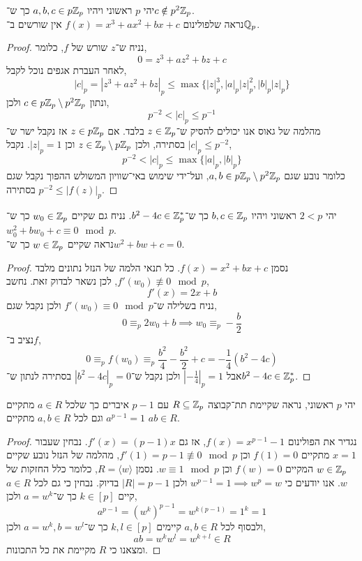 \question{}
יהי $p$ ראשוני ויהיו $a, b, c \in p \mathbb{Z}_p$ כך ש־$c \notin p^2 \mathbb{Z}_p$. \\
נראה שלפולינום $f(x) = x^3 + a x^2 + b x + c$ אין שורשים ב־$\mathbb{Q}_p$.
\begin{proof}
	נניח ש־$z$ שורש של $f$, כלומר,
	\[
		0
		= z^3 + a z^2 + b z + c
	\]
	לאחר העברת אגפים נוכל לקבל,
	\[
		|c|_p
		= |z^3 + a z^2 + b z|_p
		\le \max\{ {|z|}_p^3, |a|_p {|z|}_p^2, |b|_p |z|_p \}
	\]
	ונתון $c \in p \mathbb{Z}_p \setminus p^2 \mathbb{Z}_p$ ולכן,
	\[
		p^{-2}
		< |c|_p
		\le p^{-1}
	\]
	מהלמה של גאוס אנו יכולים להסיק ש־$z \in \mathbb{Z}_p$ בלבד.
	אם $z \in p \mathbb{Z}_p$ אז נקבל ישר ש־$|c|_p \le p^{-2}$ בסתירה, ולכן $z \in \mathbb{Z}_p \setminus p \mathbb{Z}_p$ וכן $|z|_p = 1$.
	נקבל,
	\[
		p^{-2}
		< |c|_p
		\le \max\{ |a|_p, |b|_p \}
	\]
	כלומר נובע שגם $a, b \in p \mathbb{Z}_p \setminus p^2 \mathbb{Z}_p$, ועל־ידי שימוש באי־שוויון המשולש ההפוך נקבל שגם $p^{-2} \le |f(z)|_p$ בסתירה.
\end{proof}

\question{}
יהי $2 < p$ ראשוני ויהיו $b, c \in \mathbb{Z}_p$ כך ש־$b^2 - 4c \in \mathbb{Z}_p^*$.
נניח גם שקיים $w_0 \in \mathbb{Z}_p$ כך ש־$w_0^2 + b w_0 + c \equiv 0 \mod p$. \\
נראה שקיים $w \in \mathbb{Z}_p$ כך ש־$w^2 + b w + c = 0$.
\begin{proof}
	נסמן $f(x) = x^2 + b x + c$.
	כל תנאי הלמה של הנזל נתונים מלבד $f'(w_0) \not\equiv 0 \mod p$, לכן נשאר לבדוק זאת.
	נחשב,
	\[
		f'(x)
		= 2x + b
	\]
	נניח בשלילה ש־$f'(w_0) \equiv 0 \mod p$ ולכן נקבל שגם,
	\[
		0
		\equiv_p 2 w_0 + b
		\implies w_0 \equiv_p -\frac{b}{2}
	\]
	נציב ב־$f$,
	\[
		0
		\equiv_p f(w_0)
		\equiv_p \frac{b^2}{4} - \frac{b^2}{2} + c
		= -\frac{1}{4} (b^2 - 4c)
	\]
	אבל $| -\frac{1}{4} |_p = 1$ ולכן נקבל ש־$|b^2 - 4c|_p = 0$ בסתירה לנתון ש־$b^2 - 4c \in \mathbb{Z}_p^*$.
\end{proof}

\question{}
יהי $p$ ראשוני, נראה שקיימת תת־קבוצה $R \subseteq \mathbb{Z}_p$ עם $p - 1$ איברים כך שלכל $a \in R$ מתקיים $a^{p - 1} = 1$ וגם לכל $a, b \in R$ מתקיים $a b \in R$.
\begin{proof}
	נגדיר את הפולינום $f(x) = x^{p - 1} - 1$, אז גם $f'(x) = (p - 1) x$.
	נבחין שעבור $x = 1$ מתקיים $f(1) = 0$ וכן $f'(1) = p - 1 \not\equiv 0 \mod p$, מהלמה של הנזל נובע שקיים $w \in \mathbb{Z}_p$ המקיים $f(w) = 0$ וכן $w \equiv 1 \mod p$.
	נסמן $R = \langle w \rangle$, כלומר כלל החזקות של $w$.
	אנו יודעים כי $w^{p - 1} = 1 \implies w^p = w$ ולכן $|R| = p - 1$ בדיוק.
	נבחין כי גם לכל $a \in R$ קיים $k \in [p]$ כך ש־$a = w^k$ ולכן,
	\[
		a^{p - 1}
		= {(w^k)}^{p - 1}
		= w^{k(p - 1)}
		= 1^k
		= 1
	\]
	ולבסוף לכל $a, b \in R$ קיימים $k, l \in [p]$ כך ש־$a = w^k, b = w^l$ ולכן,
	\[
		a b
		= w^k w^l
		= w^{k + l}
		\in R
	\]
	ומצאנו כי $R$ מקיימת את כל התכונות.
\end{proof}


